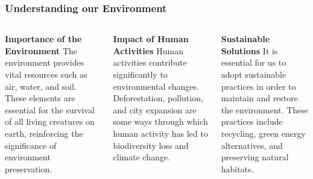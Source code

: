 \documentclass[5pt]{beamer}
\begin{document}
\begin{frame}
\frametitle{Understanding our Environment}
\begin{columns}
\begin{column}{0.3\textwidth}
\begin{block}{\textbf{Importance of the Environment}}
The environment provides vital resources such as air, water, and soil. These elements are essential for the survival of all living creatures on earth, reinforcing the significance of environment preservation.
\end{block}
\end{column}
\begin{column}{0.3\textwidth}
\begin{block}{\textbf{Impact of Human Activities}}
Human activities contribute significantly to environmental changes. Deforestation, pollution, and city expansion are some ways through which human activity has led to biodiversity loss and climate change.
\end{block}
\end{column}
\begin{column}{0.3\textwidth}
\begin{block}{\textbf{Sustainable Solutions}}
It is essential for us to adopt sustainable practices in order to maintain and restore the environment. These practices include recycling, green energy alternatives, and preserving natural habitats.
\end{block}
\end{column}
\end{columns}
\end{frame}
\end{document}
